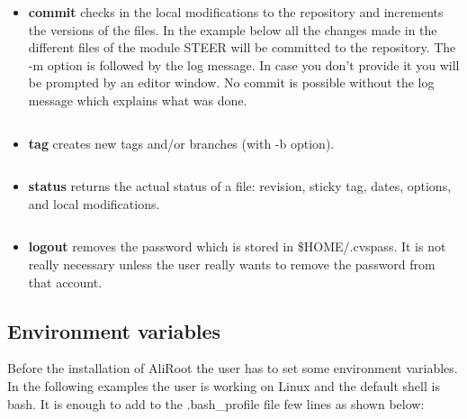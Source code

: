 \documentclass[12pt,a4paper,twoside]{article}
\begin{document}
\begin{itemize}
\item\textbf{commit}  checks   in  the  local   modifications  to  the
  repository and increments the versions  of the files. In the example
  below  all the changes  made in  the different  files of  the module
  STEER  will  be committed  to  the  repository.   The -m  option  is
  followed by the  log message. In case you don't  provide it you will
  be prompted by  an editor window. No commit  is possible without the
  log message which explains what was done.
  \begin{lstlisting}[language=sh]
    % cvs -qz9 commit -m ``Coding convention'' STEER
  \end{lstlisting}

\item\textbf{tag} creates new tags and/or branches (with -b option).
  \begin{lstlisting}[language=sh]
    % cvs tag -b v4-05-Release .
  \end{lstlisting}
\item\textbf{status} returns the actual status of a file: revision,
  sticky tag, dates, options, and local modifications.
  \begin{lstlisting}[language=sh]
    % cvs status Makefile
  \end{lstlisting}

\item\textbf{logout}   removes  the  password   which  is   stored  in
  \$HOME/.cvspass. It  is not really necessary unless  the user really
  wants to remove the password from that account.
\end{itemize}



\subsection{Environment variables}

Before  the  installation  of  AliRoot   the  user  has  to  set  some
environment variables.  In the  following examples the user is working
on Linux  and the default shell  is bash. It  is enough to add  to the
.bash\_profile file few lines as shown below:
\end{document}
